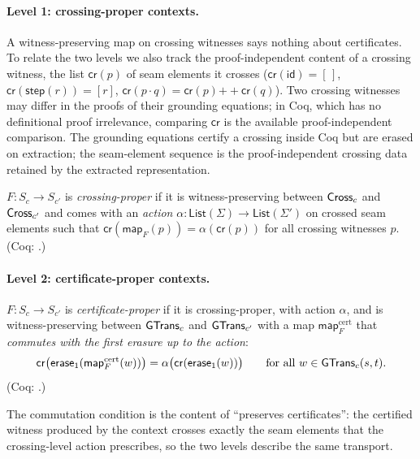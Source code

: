 \paragraph{Level 1: crossing-proper contexts.}
A witness-preserving map on crossing witnesses says nothing about certificates. To relate the two levels we also track the proof-independent content of a crossing witness, the list $\mathsf{cr}(p)$ of seam elements it crosses ($\mathsf{cr}(\mathsf{id}) = [\,]$, $\mathsf{cr}(\mathsf{step}(r)) = [r]$, $\mathsf{cr}(p \cdot q) = \mathsf{cr}(p) \mathbin{+\!\!+} \mathsf{cr}(q)$). Two crossing witnesses may differ in the proofs of their grounding equations; in Coq, which has no definitional proof irrelevance, comparing $\mathsf{cr}$ is the available proof-independent comparison. The grounding equations certify a crossing inside Coq but are erased on extraction; the seam-element sequence is the proof-independent crossing data retained by the extracted representation.
\begin{defi}\label{def:crossingproper}
$F : S_c \to S_{c'}$ is \emph{crossing-proper} if it is witness-preserving between $\mathsf{Cross}_c$ and $\mathsf{Cross}_{c'}$ and comes with an \emph{action} $\alpha : \mathsf{List}(\Sigma) \to \mathsf{List}(\Sigma')$ on crossed seam elements such that $\mathsf{cr}(\mathsf{map}_F(p)) = \alpha(\mathsf{cr}(p))$ for all crossing witnesses $p$. (Coq: .)
\end{defi}

\paragraph{Level 2: certificate-proper contexts.}
\begin{defi}\label{def:certproper}
$F : S_c \to S_{c'}$ is \emph{certificate-proper} if it is crossing-proper, with action $\alpha$, and is witness-preserving between $\mathsf{GTrans}_c$ and $\mathsf{GTrans}_{c'}$ with a map $\mathsf{map}^{\mathrm{cert}}_F$ that \emph{commutes with the first erasure up to the action}:
\[
\mathsf{cr}\bigl(\mathsf{erase}_1(\mathsf{map}^{\mathrm{cert}}_F(w))\bigr) = \alpha\bigl(\mathsf{cr}(\mathsf{erase}_1(w))\bigr) \qquad\text{for all } w \in \mathsf{GTrans}_c(s,t).
\]
(Coq: .)
\end{defi}
The commutation condition is the content of ``preserves certificates'': the certified witness produced by the context crosses exactly the seam elements that the crossing-level action prescribes, so the two levels describe the same transport.

